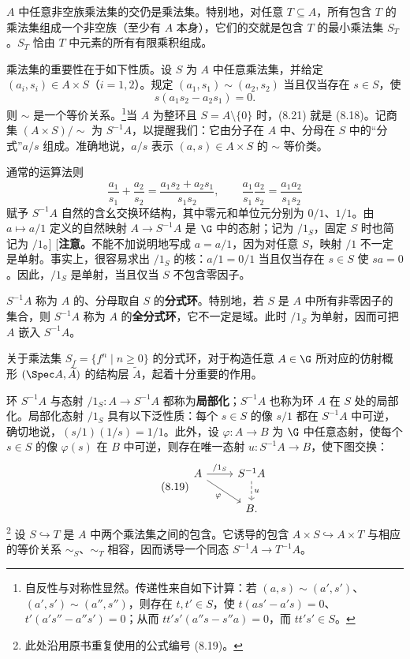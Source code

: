 $A$ 中任意非空族乘法集的交仍是乘法集。特别地，对任意 $T\subseteq A$，所有包含 $T$ 的乘法集组成一个非空族（至少有 $A$ 本身），它们的交就是包含 $T$ 的最小乘法集 $S_T$。$S_T$ 恰由 $T$ 中元素的所有有限乘积组成。

乘法集的重要性在于如下性质。设 $S$ 为 $A$ 中任意乘法集，并给定 $(a_i,s_i)\in A\times S$（$i=1,2$）。规定 $(a_1,s_1)\sim(a_2,s_2)$ 当且仅当存在 $s\in S$，使
\begin{equation}\tag{8.21}
s(a_1s_2-a_2s_1)=0.
\end{equation}
则 $\sim$ 是一个等价关系。\footnote{自反性与对称性显然。传递性来自如下计算：若 $(a,s)\sim(a',s')$、$(a',s')\sim(a'',s'')$，则存在 $t,t'\in S$，使 $t(as'-a's)=0$、$t'(a's''-a''s')=0$；从而 $tt's'(a''s-s''a)=0$，而 $tt's'\in S$。}当 $A$ 为整环且 $S=A\setminus\{0\}$ 时，(8.21) 就是 (8.18)。记商集 $(A\times S)/\!\sim$ 为 $S^{-1}A$，以提醒我们：它由分子在 $A$ 中、分母在 $S$ 中的“分式”$a/s$ 组成。准确地说，$a/s$ 表示 $(a,s)\in A\times S$ 的 $\sim$ 等价类。

通常的运算法则
\[
\frac{a_1}{s_1}+\frac{a_2}{s_2}=\frac{a_1s_2+a_2s_1}{s_1s_2},\qquad
\frac{a_1}{s_1}\frac{a_2}{s_2}=\frac{a_1a_2}{s_1s_2}
\]
赋予 $S^{-1}A$ 自然的含幺交换环结构，其中零元和单位元分别为 $0/1$、$1/1$。由 $a\mapsto a/1$ 定义的自然映射 $A\to S^{-1}A$ 是 $\G$ 中的态射；记为 $/1_S$，固定 $S$ 时也简记为 $/1$。]
[\textbf{注意。}不能不加说明地写成 $a=a/1$，因为对任意 $S$，映射 $/1$ 不一定是单射。事实上，很容易求出 $/1_S$ 的核：$a/1=0/1$ 当且仅当存在 $s\in S$ 使 $sa=0$。因此，$/1_S$ 是单射，当且仅当 $S$ 不包含零因子。

$S^{-1}A$ 称为 $A$ 的、分母取自 $S$ 的\textbf{分式环}。特别地，若 $S$ 是 $A$ 中所有非零因子的集合，则 $S^{-1}A$ 称为 $A$ 的\textbf{全分式环}，它不一定是域。此时 $/1_S$ 为单射，因而可把 $A$ 嵌入 $S^{-1}A$。

关于乘法集 $S_f=\{f^n\mid n\ge0\}$ 的分式环，对于构造任意 $A\in\G$ 所对应的仿射概形 $(\Spec A,\widetilde A)$ 的结构层 $\widetilde A$，起着十分重要的作用。

环 $S^{-1}A$ 与态射 $/1_S:A\to S^{-1}A$ 都称为\textbf{局部化}；$S^{-1}A$ 也称为环 $A$ 在 $S$ 处的局部化。局部化态射 $/1_S$ 具有以下泛性质：每个 $s\in S$ 的像 $s/1$ 都在 $S^{-1}A$ 中可逆，确切地说，$(s/1)(1/s)=1/1$。此外，设 $\varphi:A\to B$ 为 $\G$ 中任意态射，使每个 $s\in S$ 的像 $\varphi(s)$ 在 $B$ 中可逆，则存在唯一态射 $u:S^{-1}A\to B$，使下图交换：
\begin{equation}\tag{8.19}
\begin{tikzcd}[ampersand replacement=\&]
A\arrow[r,"{/1_S}"]\arrow[dr,"\varphi"']\&S^{-1}A\arrow[d,dashed,"u"]\\
\&B.
\end{tikzcd}
\end{equation}
\footnote{此处沿用原书重复使用的公式编号 (8.19)。}
设 $S\hookrightarrow T$ 是 $A$ 中两个乘法集之间的包含。它诱导的包含 $A\times S\hookrightarrow A\times T$ 与相应的等价关系
$\sim_S$、$\sim_T$ 相容，因而诱导一个同态 $S^{-1}A\to T^{-1}A$。

